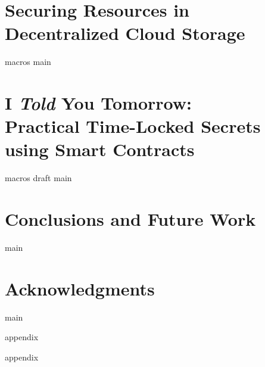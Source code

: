 \documentclass[12pt,a4paper,oldfontcommands,openright]{memoir}
\begin{document}
\chapter[Decentralized Cloud Storage]{Securing Resources in Decentralized Cloud Storage}
\label{chap:dcs}
{macros}
{main}

\chapter[I Told You Tomorrow]{I {\em Told} You Tomorrow:\\Practical Time-Locked Secrets using Smart Contracts}
\label{chap:ityt}
{macros}
{draft}
{main}

\chapter[Conclusions]{Conclusions and Future Work}
\label{chap:conclusions}
{main}



\chapter*{Acknowledgments}
\label{chap:acknowledgments}
{main}









\appendix

{appendix}

{appendix}

\end{document}
